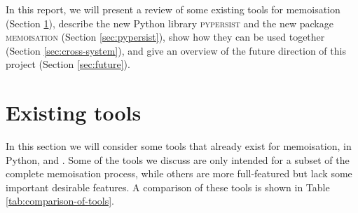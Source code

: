 \documentclass{deliverablereport}
\newcommand{\pypersist}{\textsc{pypersist}}
\newcommand{\Memoisation}{\textsc{memoisation}}
\begin{document}
In this report, we will present a review of some existing tools for memoisation
(Section \ref{sec:existing}), describe the new Python library \pypersist{} and
the new \GAP package \Memoisation{} (Section \ref{sec:pypersist}), show how they
can be used together (Section \ref{sec:cross-system}), and give an overview of
the future direction of this project (Section \ref{sec:future}).

\section{Existing tools}
\label{sec:existing}

In this section we will consider some tools that already exist for memoisation,
in Python, \Sage and \GAP.  Some of the tools we discuss are only
intended for a subset of the complete memoisation process, while others are more
full-featured but lack some important desirable features.  A comparison of these
tools is shown in Table \ref{tab:comparison-of-tools}.
\end{document}

